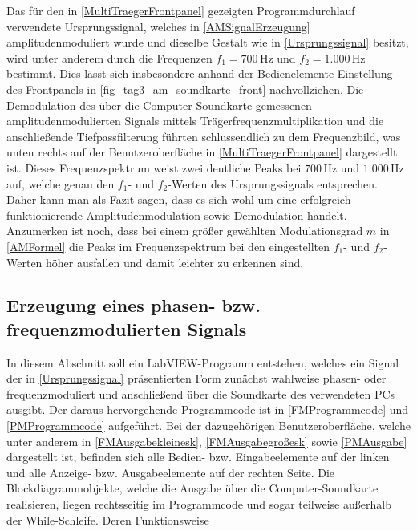 \documentclass[
a4paper,
12pt,
pagesize,
ngerman
]{scrartcl}
\begin{document}
	Das für den in \cref{MultiTraegerFrontpanel} gezeigten Programmdurchlauf verwendete Ursprungssignal, welches in \cref{AMSignalErzeugung} amplitudenmoduliert wurde und dieselbe Gestalt wie in \cref{Ursprungssignal} besitzt, wird unter anderem durch die Frequenzen $f_1 = 700\,$Hz und $f_2 = 1.000\,$Hz bestimmt. Dies lässt sich insbesondere anhand der Bedienelemente-Einstellung des Frontpanels in \cref{fig_tag3_am_soundkarte_front} nachvollziehen. Die Demodulation des über die Computer-Soundkarte gemessenen amplitudenmodulierten Signals mittels Trägerfrequenzmultiplikation und die anschließende Tiefpassfilterung führten schlussendlich zu dem Frequenzbild, was unten rechts auf der Benutzeroberfläche in \cref{MultiTraegerFrontpanel} dargestellt ist. Dieses Frequenzspektrum weist zwei deutliche Peaks bei $700\,$Hz und $1.000\,$Hz auf, welche genau den $f_1$- und $f_2$-Werten des Ursprungssignals entsprechen. Daher kann man als Fazit sagen, dass es sich wohl um eine erfolgreich funktionierende Amplitudenmodulation sowie Demodulation handelt. Anzumerken ist noch, dass bei einem größer gewählten Modulationsgrad $m$ in \cref{AMFormel} die Peaks im Frequenzspektrum bei den eingestellten $f_1$- und $f_2$-Werten höher ausfallen und damit leichter zu erkennen sind.  
	
	
	
	\subsection{Erzeugung eines phasen- bzw. frequenzmodulierten Signals}
	
	In diesem Abschnitt soll ein LabVIEW-Programm entstehen, welches ein Signal der in \cref{Ursprungssignal} präsentierten Form zunächst wahlweise phasen- oder frequenzmoduliert und anschließend über die Soundkarte des verwendeten PCs ausgibt. Der daraus hervorgehende Programmcode ist in \cref{FMProgrammcode} und \cref{PMProgrammcode} aufgeführt. Bei der dazugehörigen Benutzeroberfläche, welche unter anderem in \cref{FMAusgabekleinesk}, \cref{FMAusgabegroßesk} sowie \cref{PMAusgabe} dargestellt ist, befinden sich alle Bedien- bzw. Eingabeelemente auf der linken und alle Anzeige- bzw. Ausgabeelemente auf der rechten Seite. Die Blockdiagrammobjekte, welche die Ausgabe über die Computer-Soundkarte realisieren, liegen rechtsseitig im Programmcode und sogar teilweise außerhalb der While-Schleife. Deren Funktionsweise 
	
\end{document}
